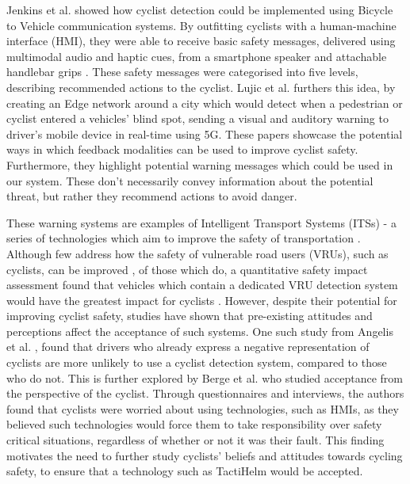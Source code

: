 \documentclass{mpaper}
\begin{document}
Jenkins et al. \cite{7929602} showed how cyclist detection could be implemented using Bicycle to Vehicle communication systems. By outfitting cyclists with a human-machine interface (HMI), they were able to receive basic safety messages, delivered using multimodal audio and haptic cues, from a smartphone speaker and attachable handlebar grips \cite{smartgrips}. These safety messages were categorised into five levels, describing recommended actions to the cyclist. Lujic et al. \cite{10.1145/3434770.3459732} furthers this idea, by creating an Edge network around a city which would detect when a pedestrian or cyclist entered a vehicles' blind spot, sending a visual and auditory warning to driver's mobile device in real-time using 5G. These papers showcase the potential ways in which feedback modalities can be used to improve cyclist safety. Furthermore, they highlight potential warning messages which could be used in our system. These don't necessarily convey information about the potential threat, but rather they recommend actions to avoid danger.

These warning systems are examples of Intelligent Transport Systems (ITSs) - a series of technologies which aim to improve the safety of transportation \cite{its}. Although few address how the safety of vulnerable road users (VRUs), such as cyclists, can be improved \cite{Scholliers2017}, of those which do, a quantitative safety impact assessment found that vehicles which contain a dedicated VRU detection system would have the greatest impact for cyclists \cite{SILLA2017134}. However, despite their potential for improving cyclist safety, studies have shown that pre-existing attitudes and perceptions affect the acceptance of such systems. One such study from Angelis et al. \cite{de2017negative}, found that drivers who already express a negative representation of cyclists are more unlikely to use a cyclist detection system, compared to those who do not. This is further explored by Berge et al. \cite{berge2022cyclists} who studied acceptance from the perspective of the cyclist. Through questionnaires and interviews, the authors found that cyclists were worried about using technologies, such as HMIs, as they believed such technologies would force them to take responsibility over safety critical situations, regardless of whether or not it was their fault. This finding motivates the need to further study cyclists' beliefs and attitudes towards cycling safety, to ensure that a technology such as TactiHelm would be accepted.
\end{document}
